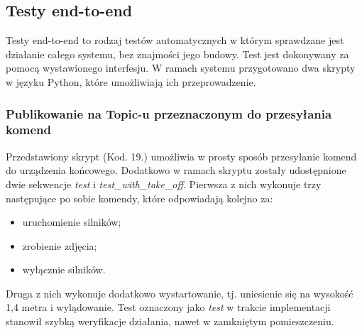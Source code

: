 \subsection{Testy end-to-end}

Testy end-to-end to rodzaj testów automatycznych w którym sprawdzane jest działanie całego systemu, bez znajmości jego budowy. Test jest dokonywany za pomocą wystawionego interfesju. W ramach systemu przygotowano dwa skrypty w języku Python, które umożliwiają ich przeprowadzenie. 

\subsubsection{Publikowanie na Topic-u przeznaczonym do przesyłania komend} 

Przedstawiony skrypt (Kod. 19.) umożliwia w prosty sposób przesyłanie komend do urządzenia końcowego. Dodatkowo w ramach skryptu zostały udostępnione dwie sekwencje \textit{test} i \textit{test\_with\_take\_off}. Pierwsza z nich wykonuje trzy następujące po sobie komendy, które odpowiadają kolejno za:
\begin{itemize}
  \item uruchomienie silników;
  \item zrobienie zdjęcia;
  \item wyłącznie silników.
\end{itemize}
Druga z nich wykonuje dodatkowo wystartowanie, tj. uniesienie się na wysokość 1,4 metra i wylądowanie. Test oznaczony jako \textit{test} w trakcie implementacji stanowił szybką weryfikacje działania, nawet w zamkniętym pomieszczeniu.

